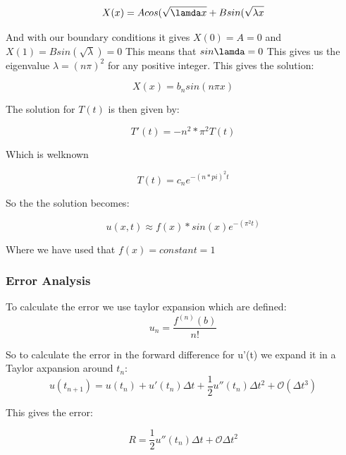\documentclass[a4paper,10pt]{article}
\begin{document}
\begin{equation}

 X(x) = Acos(\sqrt{\lamda x} + Bsin(\sqrt{\lambda x}
\end{equation}

And with our boundary conditions it gives $X(0) = A = 0$ and $X(1) = Bsin(\sqrt{\lambda}) = 0$
This means that $sin\lamda = 0$ This gives us the eigenvalue $\lambda = (n\pi)^2$ for any positive integer.
This gives the solution:

\begin{equation}
 X(x) = b_nsin(n\pi x)
\end{equation}

The solution for $T(t)$ is then given by:

\begin{equation}
 T'(t) = -n^2*\pi ^2 T(t)
\end{equation}

Which is welknown 

\begin{equation}
 T(t) = c_ne^{-(n*pi)^2t}
\end{equation}

So the the solution becomes:

\begin{equation}
 u(x,t) \approx f(x)*sin(x)e^{-(\pi^2t)}
 \end{equation}

 Where we have used that $f(x) = constant = 1$

\subsubsection{Error Analysis}
To calculate the error we use taylor expansion which are defined:
\begin{equation}
 u_n = \frac{f^{(n)}(b)}{n!}
\end{equation}

So to calculate the error in the forward difference for u'(t) we expand it in a Taylor axpansion around $t_n$:
\begin{equation}
 u(t_{n+1}) = u(t_n) + u'(t_n)\Delta t + \frac{1}{2}u''(t_n)\Delta t^2 + \mathcal{O}(\Delta t^3)
\end{equation}

This gives the error:

\begin{equation}
 R = \frac{1}{2}u''(t_n)\Delta t + \mathcal{O}\Delta t^2
\end{equation}
\end{document}
